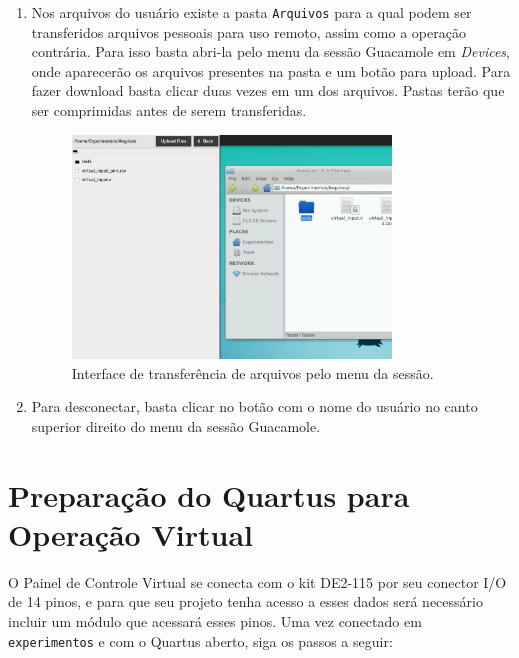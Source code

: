 \documentclass[12pt]{article}
\begin{document}
\begin{enumerate}[font=\bfseries]
    \item Nos arquivos do usuário existe a pasta \verb|Arquivos| para a qual podem ser transferidos arquivos pessoais para uso remoto, assim como a operação contrária. Para isso basta abri-la pelo menu da sessão Guacamole em \textit{Devices}, onde aparecerão os arquivos presentes na pasta e um botão para upload. Para fazer download basta clicar duas vezes em um dos arquivos. Pastas terão que ser comprimidas antes de serem transferidas.
    
    \begin{figure}[H]
    \centering
    \includegraphics[width=0.8\textwidth]{img/trans-guaca.jpg}
    \caption{\label{ref:trans-guaca}Interface de transferência de arquivos pelo menu da sessão.}
    \end{figure}
    
    \item Para desconectar, basta clicar no botão com o nome do usuário no canto superior direito do menu da sessão Guacamole.
\end{enumerate}

\section{Preparação do Quartus para Operação Virtual}
O Painel de Controle Virtual se conecta com o kit DE2-115 por seu conector I/O de 14 pinos, e para que seu projeto tenha acesso a esses dados será necessário incluir um módulo que acessará esses pinos. Uma vez conectado em \verb|experimentos| e com o Quartus aberto, siga os passos a seguir:
\end{document}
